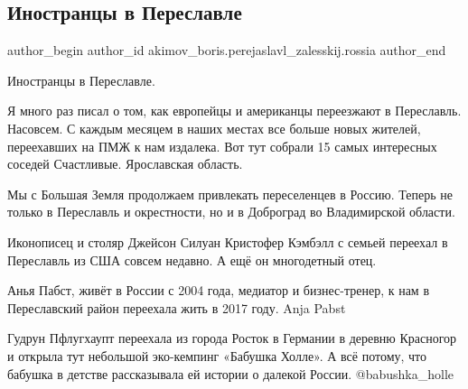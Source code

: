  
 
 
 
 
 
\subsection{Иностранцы в Переславле}
\label{sec:21_01_2022.fb.akimov_boris.perejaslavl_zalesskij.rossia.1.inostrancy}
 
\ifcmt
 author_begin
   author_id akimov_boris.perejaslavl_zalesskij.rossia
 author_end
\fi

Иностранцы в Переславле. 

Я много раз писал о том, как европейцы и американцы переезжают в Переславль.
Насовсем. С каждым месяцем в наших местах все больше новых жителей, переехавших
на ПМЖ к нам издалека. Вот тут собрали 15 самых интересных соседей Счастливые.
Ярославская область. 


Мы с Большая Земля продолжаем привлекать переселенцев в Россию. Теперь не
только в Переславль и окрестности, но и в Доброград во Владимирской области. 

Иконописец и столяр Джейсон Силуан Кристофер Кэмбэлл с семьей переехал в
Переславль из США совсем недавно. А ещё он многодетный отец.


Анья Пабст, живёт в России с 2004 года, медиатор и  бизнес-тренер, к нам в
Переславский район переехала жить в 2017 году. Anja Pabst

Гудрун Пфлугхаупт переехала из города Росток в Германии в деревню Красногор и
открыла тут небольшой эко-кемпинг «Бабушка Холле». А всё потому, что бабушка в
детстве рассказывала ей истории о далекой России. @babushka\_holle



